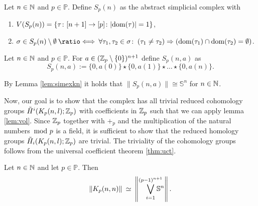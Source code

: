 \begin{defin}
  Let $n \in \mathbb{N}$ and $p \in \mathbb{P}$. Define $S_p(n)$ as the abstract simplicial complex with
  \begin{enumerate}[label=\roman*.)]
    \item $V(S_p(n)) = \{\tau\colon [n+1]\to [p]\colon |{\rm dom}(\tau)| = 1\}$,
    \item $\sigma \in S_p(n)\setminus\emptyset \: \longeq \: \forall \tau_1,\tau_2\in\sigma\colon \: (\tau_1 \neq \tau_2) \Rightarrow (\dom(\tau_1) \cap \dom(\tau_2) = \emptyset)$.
  \end{enumerate}
\end{defin}

\begin{defin}
  Let $n \in \mathbb{N}$ and $p\in\mathbb{P}$. For $a \in (\mathbb{Z}_p\setminus\{0\})^{n+1}$ define $S_p(n,a)$ as
  \begin{equation*}
    S_p(n,a) := \{0, a(0)\} \star \{0,a(1)\} \star \ldots \star \{0,a(n)\}.
  \end{equation*}
\end{defin}

\begin{rem}\label{rem:s}
  By Lemma \ref{lem:simexkn} it holds that $\lVert S_p(n,a) \rVert \cong \mathbb{S}^{n}$ for $n\in\mathbb{N}$.
\end{rem}

Now, our goal is to show that the complex has all trivial reduced cohomology groups $\tilde{H}^i(K_p(n,l); \mathbb{Z}_p)$ with coefficients in $\mathbb{Z}_p$ such that we can apply lemma \ref{lem:vol}. Since $\mathbb{Z}_p$ together with $+_p$ and the multiplication of the natural numbers $\hspace*{-5px}\mod p$ is a field, it is sufficient to show that the reduced homology groups $\tilde{H}_i(K_p(n,l); \mathbb{Z}_p)$ are trivial. The triviality of the cohomology groups follows from the universal coefficient theorem \ref{thm:uct}. 

\begin{lemma}
  Let $n \in \mathbb{N}$ and let $p \in \mathbb{P}$. Then
  \begin{equation*}
    \lVert K_p(n,n) \rVert \: \simeq \: \left\lVert\bigvee_{i=1}^{(p-1)^{n+1}}\hspace*{-10px}\mathbb{S}^{n}\right\rVert.
  \end{equation*}
\end{lemma}

